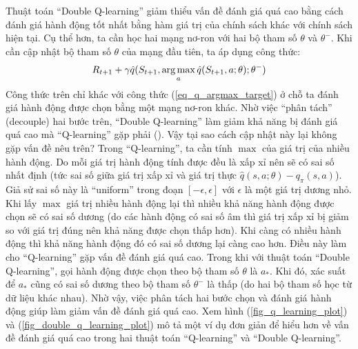 	Thuật toán ``Double Q-learning'' giảm thiểu vấn đề đánh giá quá cao bằng cách đánh giá hành động tốt nhất bằng hàm giá trị của chính sách khác với chính sách hiện tại.
	Cụ thể hơn, ta cần học hai mạng nơ-ron với hai bộ tham số $\theta$ và $\theta^{-}$.
	Khi cần cập nhật bộ tham số $\theta$ của mạng đầu tiên, ta áp dụng công thức:
	\begin{equation}
		\label{eq_dq_argmax_target}
		R_{t+1} + \gamma \hat{q}(S_{t+1}, \argmax_{a}\hat{q}(S_{t+1}, a;\theta); \theta^{-})
	\end{equation}
	Công thức trên chỉ khác với công thức (\ref{eq_q_argmax_target}) ở chỗ ta đánh giá hành động được chọn bằng một mạng nơ-ron khác.
	Nhờ việc ``phân tách'' (decouple) hai bước trên, ``Double Q-learning'' làm giảm khả năng bị đánh giá quá cao mà ``Q-learning'' gặp phải (\cite{hasselt2010double}).
	Vậy tại sao cách cập nhật này lại không gặp vấn đề nêu trên?
	Trong ``Q-learning'', ta cần tính $\max$ của giá trị của nhiều hành động.
	Do mỗi giá trị hành động tính được đều là xấp xỉ nên sẽ có sai số nhất định (tức sai số giữa giá trị xấp xỉ và giá trị thực $\hat{q}(s, a;\theta) - q_{\pi}(s, a)$).
	Giả sử sai số này là ``uniform'' trong đoạn $[-\epsilon, \epsilon]$ với $\epsilon$ là một giá trị dương nhỏ.
	Khi lấy $\max$ giá trị nhiều hành động lại thì nhiều khả năng hành động được chọn sẽ có sai số dương (do các hành động có sai số âm thì giá trị xấp xỉ bị giảm so với giá trị đúng nên khả năng được chọn thấp hơn).
	Khi càng có nhiều hành động thì khả năng hành động đó có sai số dương lại càng cao hơn.
	Điều này làm cho ``Q-learning'' gặp vấn đề đánh giá quá cao.
	Trong khi với thuật toán ``Double Q-learning'', gọi hành động được chọn theo bộ tham số $\theta$ là $a_{*}$.
	Khi đó, xác suất để $a_{*}$ cũng có sai số dương theo bộ tham số $\theta^{-}$ là thấp (do hai bộ tham số học từ dữ liệu khác nhau).
	Nhờ vậy, việc phân tách hai bước chọn và đánh giá hành động giúp làm giảm vấn đề đánh giá quá cao.
	Xem hình (\ref{fig_q_learning_plot}) và (\ref{fig_double_q_learning_plot}) mô tả một ví dụ đơn giản để hiểu hơn về vấn đề đánh giá quá cao trong hai thuật toán ``Q-learning'' và ``Double Q-learning''.
